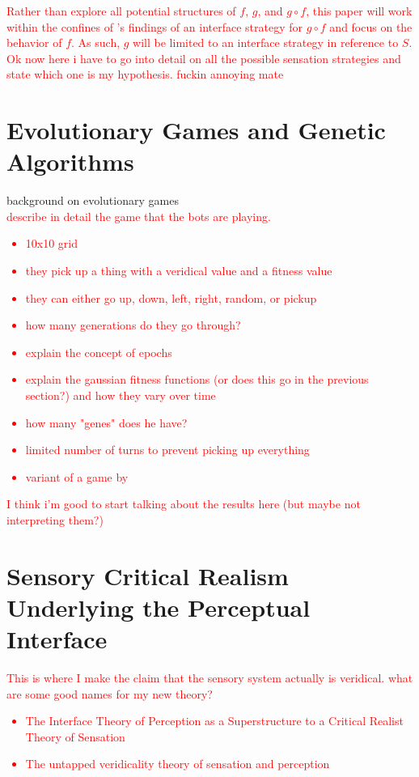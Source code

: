 \documentclass{article}[10pt]
\begin{document}
%
\textcolor{red}{Rather than explore all potential structures of $f$, $g$, and $g \circ f$, this paper will work within the confines of \citeauthor{mark2010natural}'s findings of an interface strategy for $g \circ f$ and focus on the behavior of $f$. As such, $g$ will be limited to an interface strategy in reference to $S$.} \\


\textcolor{red}{Ok now here i have to go into detail on all the possible sensation strategies and state which one is my hypothesis. fuckin annoying mate}


\section{Evolutionary Games and Genetic Algorithms}

background on evolutionary games \\

\textcolor{red}{describe in detail the game that the bots are playing.}
\textcolor{red}{\begin{itemize}
    \item 10x10 grid
    \item they pick up a thing with a veridical value and a fitness value
    \item they can either go up, down, left, right, random, or pickup
    \item how many generations do they go through?
    \item explain the concept of epochs
    \item explain the gaussian fitness functions (or does this go in the previous section?) and how they vary over time
    \item how many "genes" does he have?
    \item limited number of turns to prevent picking up everything
    \item variant of a game by 
\end{itemize}}

\textcolor{red}{I think i'm good to start talking about the results here (but maybe not interpreting them?)}

\section{Sensory Critical Realism Underlying the Perceptual Interface}

\textcolor{red}{This is where I make the claim that the sensory system actually is veridical. what are some good names for my new theory?}
\textcolor{red}{\begin{itemize}
    \item The Interface Theory of Perception as a Superstructure to a Critical Realist Theory of Sensation
    \item The untapped veridicality theory of sensation and perception
\end{itemize}}
\end{document}
